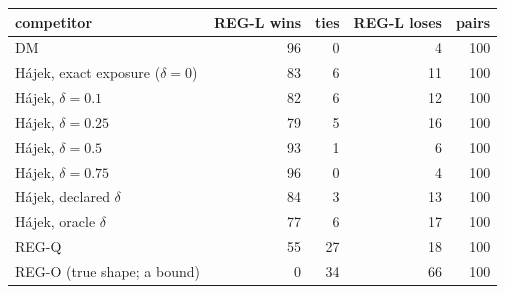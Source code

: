 \footnotesize
\begin{tabular}{lrrrr}
\toprule
competitor & REG-L wins & ties & REG-L loses & pairs \\
\midrule
DM & 96 & 0 & 4 & 100 \\
H\'ajek, exact exposure ($\delta=0$) & 83 & 6 & 11 & 100 \\
H\'ajek, $\delta=0.1$ & 82 & 6 & 12 & 100 \\
H\'ajek, $\delta=0.25$ & 79 & 5 & 16 & 100 \\
H\'ajek, $\delta=0.5$ & 93 & 1 & 6 & 100 \\
H\'ajek, $\delta=0.75$ & 96 & 0 & 4 & 100 \\
H\'ajek, declared $\delta$ & 84 & 3 & 13 & 100 \\
H\'ajek, oracle $\delta$ & 77 & 6 & 17 & 100 \\
REG-Q & 55 & 27 & 18 & 100 \\
REG-O (true shape; a bound) & 0 & 34 & 66 & 100 \\
\bottomrule
\end{tabular}
